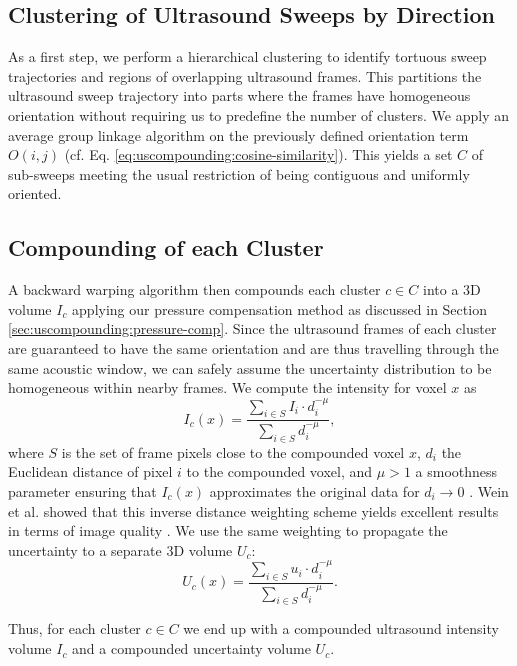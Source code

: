 \subsection{Clustering of Ultrasound Sweeps by Direction}
As a first step, we perform a hierarchical clustering to identify tortuous sweep trajectories and regions of overlapping ultrasound frames.
This partitions the ultrasound sweep trajectory into parts where the frames have homogeneous orientation without requiring us to predefine the number of clusters.
We apply an average group linkage algorithm on the previously defined orientation term $O(i, j)$ (cf. Eq. \ref{eq:uscompounding:cosine-similarity}).
This yields a set $C$ of sub-sweeps meeting the usual restriction of being contiguous and uniformly oriented.

\subsection{Compounding of each Cluster}
\label{sec:uscompounding:compounding-of-each-cluster}
A backward warping algorithm then compounds each cluster $c \in C$ into a 3D volume $I_c$ applying our pressure compensation method as discussed in Section \ref{sec:uscompounding:pressure-comp}.
Since the ultrasound frames of each cluster are guaranteed to have the same orientation and are thus travelling through the same acoustic window, we can safely assume the uncertainty distribution to be homogeneous within nearby frames.
We compute the intensity for voxel $x$ as
\begin{equation}
	I_c(x)		=		\frac{\sum_{i\in S} I_i \cdot d_i^{-\mu}}{\sum_{i \in S} d_i^{-\mu}},
\end{equation}
where $S$ is the set of frame pixels close to the compounded voxel $x$, $d_i$ the Euclidean distance of pixel $i$ to the compounded voxel, and $\mu>1$ a smoothness parameter ensuring that $I_c(x)$ approximates the original data for $d_i \rightarrow 0$ \cite{Shepard68}.
Wein et al. showed that this inverse distance weighting scheme yields excellent results in terms of image quality \cite{Wein06}.
We use the same weighting to propagate the uncertainty to a separate 3D volume $U_c$:
\begin{equation}
	U_c(x)		=		\frac{\sum_{i\in S} u_i \cdot d_i^{-\mu}}{\sum_{i \in S} d_i^{-\mu}}.
\end{equation}

Thus, for each cluster $c \in C$ we end up with a compounded ultrasound intensity volume $I_c$ and a compounded uncertainty volume $U_c$.


